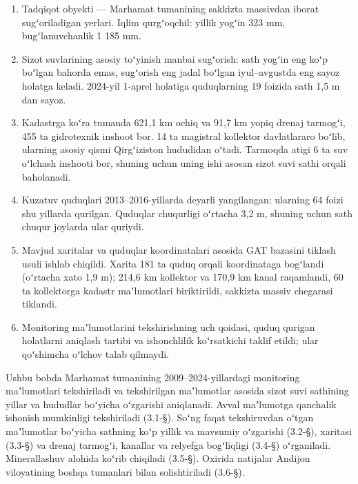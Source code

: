 
\begin{enumerate}
\def\labelenumi{\arabic{enumi}.}
\tightlist
\item
  Tadqiqot obyekti --- Marhamat tumanining sakkizta massivdan iborat
  sugʻoriladigan yerlari. Iqlim qurgʻoqchil: yillik yogʻin 323 mm,
  bugʻlanuvchanlik 1 185 mm.
\item
  Sizot suvlarining asosiy toʻyinish manbai sugʻorish: sath yogʻin eng
  koʻp boʻlgan bahorda emas, sugʻorish eng jadal boʻlgan iyul--avgustda
  eng sayoz holatga keladi. 2024-yil 1-aprel holatiga quduqlarning 19
  foizida sath 1,5 m dan sayoz.
\item
  Kadastrga koʻra tumanda 621,1 km ochiq va 91,7 km yopiq drenaj
  tarmogʻi, 455 ta gidrotexnik inshoot bor. 14 ta magistral kollektor
  davlatlararo boʻlib, ularning asosiy qismi Qirgʻiziston hududidan
  oʻtadi. Tarmoqda atigi 6 ta suv oʻlchash inshooti bor, shuning uchun
  uning ishi asosan sizot suvi sathi orqali baholanadi.
\item
  Kuzatuv quduqlari 2013--2016-yillarda deyarli yangilangan: ularning 64
  foizi shu yillarda qurilgan. Quduqlar chuqurligi oʻrtacha 3,2 m,
  shuning uchun sath chuqur joylarda ular quriydi.
\item
  Mavjud xaritalar va quduqlar koordinatalari asosida GAT bazasini
  tiklash usuli ishlab chiqildi. Xarita 181 ta quduq orqali koordinataga
  bogʻlandi (oʻrtacha xato 1,9 m); 214,6 km kollektor va 170,9 km kanal
  raqamlandi, 60 ta kollektorga kadastr maʼlumotlari biriktirildi,
  sakkizta massiv chegarasi tiklandi.
\item
  Monitoring maʼlumotlarini tekshirishning uch qoidasi, quduq qurigan
  holatlarni aniqlash tartibi va ishonchlilik koʻrsatkichi taklif
  etildi; ular qoʻshimcha oʻlchov talab qilmaydi.
\end{enumerate}


Ushbu bobda Marhamat tumanining 2009--2024-yillardagi monitoring
maʼlumotlari tekshiriladi va tekshirilgan maʼlumotlar asosida sizot suvi
sathining yillar va hududlar boʻyicha oʻzgarishi aniqlanadi. Avval
maʼlumotga qanchalik ishonish mumkinligi tekshiriladi (3.1-§). Soʻng
faqat tekshiruvdan oʻtgan maʼlumotlar boʻyicha sathning koʻp yillik va
mavsumiy oʻzgarishi (3.2-§), xaritasi (3.3-§) va drenaj tarmogʻi,
kanallar va relyefga bogʻliqligi (3.4-§) oʻrganiladi. Minerallashuv
alohida koʻrib chiqiladi (3.5-§). Oxirida natijalar Andijon viloyatining
boshqa tumanlari bilan solishtiriladi (3.6-§).

